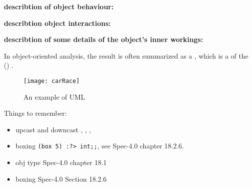 \textbf{describtion of object behaviour:}


\textbf{describtion object interactions:}

\textbf{describtion of some details of the object's inner workings:}

In object-oriented analysis, the result is often summarized as a , which is a  of the  () \cite{uml2}.

\begin{figure}
  \centering
  \texttt{[image: carRace]}
  \caption{An example of UML}
  \label{uml}
\end{figure}

Things to remember: 
\begin{itemize}
\item upcast and downcast , \lexeme{:>},
  , 
\item boxing \lstinline|(box 5) :?> int;;|, see Spec-4.0 chapter
  18.2.6.
\item obj type Spec-4.0 chapter 18.1
\item boxing Spec-4.0 Section 18.2.6
\end{itemize}

